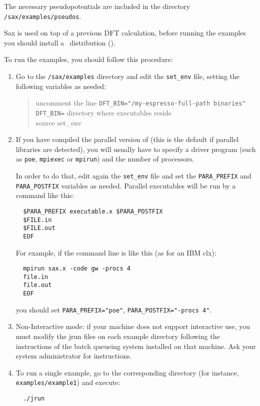 \documentclass[11pt]{article}
\begin{document}
The necessary pseudopotentials are included in the directory \texttt{/sax/examples/pseudos}.

Sax is used on top of a previous DFT calculation, before running the examples you should install a 
\ESPRESSO~distribution (\ESPRESSOURL). 

To run the examples, you should follow this procedure:

\begin{enumerate}
  \item
Go to the \texttt{/sax/examples} directory and edit the \texttt{set\_env} file, setting the following variables as needed:
\begin{quote}
  uncomment the line \texttt{DFT\_BIN="/my-espresso-full-path binaries"}\\
  \texttt{DFT\_BIN=} directory where \ESPRESSO executables reside\\
  source set\_env\\
\end{quote}

  \item
If you have compiled the parallel version of \SAX (this
is the default if parallel libraries are detected), you will usually 
have to specify a driver program (such as
\texttt{poe}, \texttt{mpiexec} or \texttt{mpirun}) and the number of processors.

In order to do that, edit again the \texttt{set\_env}
file and set the \texttt{PARA\_PREFIX} and \texttt{PARA\_POSTFIX}
variables as needed.
Parallel executables will be run by a command like this:
\begin{verbatim}
  $PARA_PREFIX executable.x $PARA_POSTFIX
  $FILE.in
  $FILE.out
  EOF
\end{verbatim}

For example, if the command line is like this (as for an IBM clx):
\begin{verbatim}
  mpirun sax.x -code gw -procs 4 
  file.in
  file.out
  EOF
\end{verbatim}
you should set \texttt{PARA\_PREFIX="poe"},
\texttt{PARA\_POSTFIX="-procs 4"}.

\item
Non-Interactive mode: if your machine does not support interactive use, you
must modify the jrun files on each example directory following the instructions of the batch queueing
system installed on that machine.
Ask your system administrator for instructions.

  \item
To run a single example, go to the corresponding directory (for
instance, \texttt{examples/example1}) and execute:
\begin{verbatim}
  ./jrun
\end{verbatim}


\end{enumerate}
\end{document}
